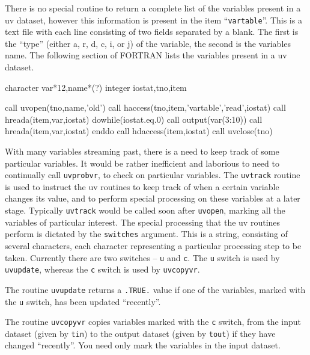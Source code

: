 There is no special routine to return a complete list of the variables
present in a uv dataset, however this information is present in the 
item ``{\tt vartable}''. This is a text file with each line
consisting of two fields separated by a blank. The first is the ``type''
(either a, r, d, c, i, or j) of the variable, the second is the variables
name.  The following section of FORTRAN lists the variables present in a
uv dataset.
{\ninepoint\begintt

       character var*12,name*(?)
       integer iostat,tno,item

       call uvopen(tno,name,'old')
       call haccess(tno,item,'vartable','read',iostat)
       call hreada(item,var,iostat)
       dowhile(iostat.eq.0)
         call output(var(3:10))
         call hreada(item,var,iostat)
       enddo
       call hdaccess(item,iostat)
       call uvclose(tno)

\endtt}


With many variables streaming past, there is a need to keep track of some
particular variables. It would be rather inefficient and laborious to need
to continually call {\tt uvprobvr}, to check on particular variables. The
{\tt uvtrack} routine is used to instruct the uv routines to keep track
of when a certain variable changes its value, and to perform special
processing on these variables at a later stage. Typically {\tt uvtrack}
would be called soon after {\tt uvopen}, marking all the variables of
particular interest. The special processing that the uv routines perform
is dictated by the {\tt switches} argument. This is a string,
consisting of several characters, each character representing a particular
processing step to be taken. Currently there are two switches --
{\tt u} and {\tt c}. The {\tt u} switch is used by {\tt uvupdate}, whereas
the {\tt c} switch is used by {\tt uvcopyvr}.

The routine {\tt uvupdate} returns a {\tt .TRUE.} value if one of the
variables, marked with the {\tt u} switch, has been updated ``recently''.

The routine {\tt uvcopyvr} copies variables marked with the {\tt c}
switch, from the input dataset (given by {\tt tin}) to the output
dataset (given by {\tt tout}) if they have changed ``recently''.  You need
only mark the variables in the input dataset.


